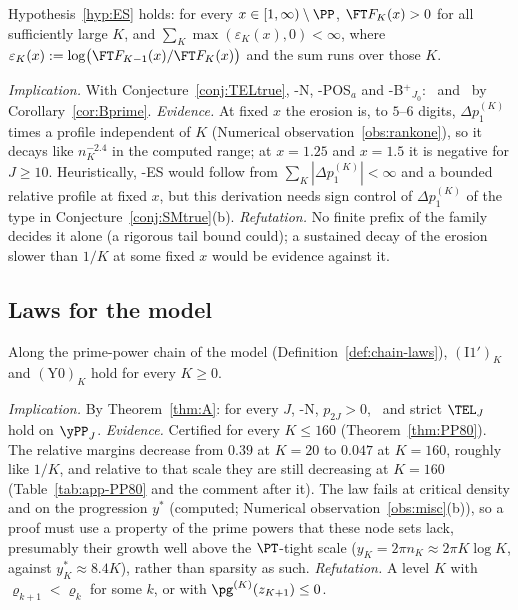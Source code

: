 \begin{conjecture}\label{conj:ES}
Hypothesis~\ref{hyp:ES} holds: for every $x\in[1,\infty)\setminus\PP$, $\FT F_K(x)>0$ for all sufficiently large $K$, and
$\sum_K\max(\varepsilon_K(x),0)<\infty$, where $\varepsilon_K(x):=\log\bigl(\FT F_{K-1}(x)/\FT F_K(x)\bigr)$ and the sum runs over
those $K$.
\end{conjecture}

\emph{Implication.} With Conjecture~\ref{conj:TELtrue}, \hyp{N}, \hyp{POS$_a$} and \hyp{B$^+$}$_{J_0}$:
\condS\ and \condU\ by Corollary~\ref{cor:Bprime}. \emph{Evidence.} At fixed $x$ the erosion is, to $5$--$6$ digits,
$\Delta p_1^{(K)}$ times a profile independent of $K$ (Numerical observation~\ref{obs:rankone}), so it decays like
$n_K^{-2.4}$ in the computed range; at $x=1.25$ and $x=1.5$ it is negative for $J\ge10$. Heuristically, \hyp{ES} would
follow from $\sum_K|\Delta p_1^{(K)}|<\infty$ and a bounded relative profile at fixed $x$, but this derivation needs sign
control of $\Delta p_1^{(K)}$ of the type in Conjecture~\ref{conj:SMtrue}(b). \emph{Refutation.} No finite prefix of the
family decides it alone (a rigorous tail bound could); a sustained decay of the erosion slower than $1/K$ at some fixed $x$
would be evidence against it.

\subsection{Laws for the model}\label{ssec:conj-toy}

\begin{conjecture}\label{conj:I1prime}
Along the prime-power chain of the model (Definition~\ref{def:chain-laws}), $(\mathrm{I1}')_K$ and $(\mathrm{Y0})_K$ hold
for every $K\ge0$.
\end{conjecture}

\emph{Implication.} By Theorem~\ref{thm:A}: for every $J$, \hyp{N}, $p_{2J}>0$, \Rp\ and strict $\TEL_J$ hold on
$\yPP_J$. \emph{Evidence.} Certified for every $K\le160$ (Theorem~\ref{thm:PP80}). The relative margins decrease from
$0.39$ at $K=20$ to $0.047$ at $K=160$, roughly like $1/K$, and relative to that scale they are still decreasing at
$K=160$ (Table~\ref{tab:app-PP80} and the comment after it). The law fails at critical density and on
the progression $y^*$ (computed; Numerical observation~\ref{obs:misc}(b)), so a proof must use a property of the prime powers
that these node sets lack, presumably their growth well above the $\PT$-tight scale ($y_K=2\pi n_K\approx2\pi K\log K$, against
$y^*_K\approx8.4K$), rather than sparsity as such.
\emph{Refutation.} A level $K$ with $\varrho_{k+1}<\varrho_k$ for some $k$, or with $\pg^{(K)}(z_{K+1})\le0$.

